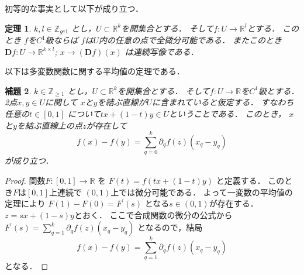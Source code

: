 \documentclass[leqno, a4paper, 12pt]{jsarticle}
\newtheorem{thm}{定理}
\newtheorem{lem}[thm]{補題}
\newcommand{\zz}{\mathbb{Z}}
\newcommand{\rr}{\mathbb{R}}
\newcommand{\ddd}{\mathbf{D}}
\begin{document}
初等的な事実として以下が成り立つ．
\begin{thm}
$k, l\in \zz_{ge 1}$
とし，$U\subset \rr^{k}$を開集合とする．
そして$f: U\to \rr^{l}$とする．
このとき
$f$を$C^{1}$級ならば
$f$は$U$内の任意の点で全微分可能である．
またこのとき$\ddd f: U\to \rr^{k\times l}$; 
$x\to (\ddd f)(x)$
は連続写像である．
\end{thm}

以下は多変数関数に関する平均値の定理である．
\begin{lem}\label{lem:heikinnti}
$k\in \zz_{\ge 1}$
とし，$U\subset \rr^{k}$を開集合とする．
そして$f: U\to \rr$を$C^{1}$級とする．
2点$x, y\in U$に関して
$x$と$y$を結ぶ直線が$U$に含まれていると仮定する．
すなわち任意の$t\in [0, 1]$
について$tx+(1-t)y\in U$ということである．
このとき，
$x$と$y$を結ぶ直線上の点$z$が存在して
\[
f(x)-f(y)=\sum_{q=0}^{k}\partial_{q}f(z)(x_{q}-y_{q})
\]
が成り立つ．
\end{lem}

\begin{proof}
関数$F\colon [0, 1]\to \rr$
を
$F(t)=f(tx+(1-t)y)$
と定義する．
このとき$F$は$[0, 1]$上連続で
$(0, 1)$上では微分可能である．
よって一変数の平均値の定理により
$F(1)-F(0)=F^{\prime}(s)$
となる$s\in (0, 1)$が存在する．
$z=sx+(1-s)y$とおく．
ここで合成関数の微分の公式から
$F^{\prime}(s)=
\sum_{q=1}^{k}\partial_{q}f(z)(x_{q}-y_{q})$
となるので，結局
\[
f(x)-f(y)=\sum_{q=1}^{k}\partial_{q}f(z)(x_{q}-y_{q})
\]
となる．
\end{proof}
\end{document}
